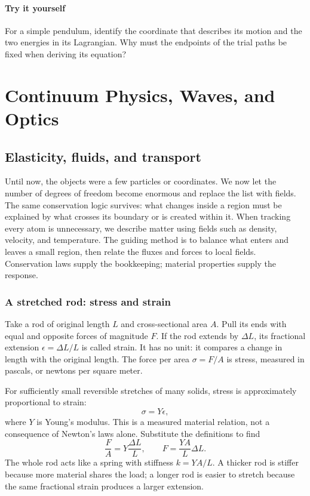 \documentclass[11pt,oneside]{book}
\theoremstyle{reviewstyle}
\newcommand{\learningcheck}[1]{\subsection*{Try it yourself}\noindent #1\par}
\begin{document}
\learningcheck{For a simple pendulum, identify the coordinate that describes its motion and the two energies in its Lagrangian. Why must the endpoints of the trial paths be fixed when deriving its equation?}

\part{Continuum Physics, Waves, and Optics}
\chapter{Elasticity, fluids, and transport}
Until now, the objects were a few particles or coordinates. We now let the number of degrees of freedom become enormous and replace the list with fields. The same conservation logic survives: what changes inside a region must be explained by what crosses its boundary or is created within it.
When tracking every atom is unnecessary, we describe matter using fields such as density, velocity, and temperature. The guiding method is to balance what enters and leaves a small region, then relate the fluxes and forces to local fields. Conservation laws supply the bookkeeping; material properties supply the response.

\section{A stretched rod: stress and strain}
Take a rod of original length $L$ and cross-sectional area $A$. Pull its ends with equal and opposite forces of magnitude $F$. If the rod extends by $\Delta L$, its fractional extension $\epsilon=\Delta L/L$ is called strain. It has no unit: it compares a change in length with the original length. The force per area $\sigma=F/A$ is stress, measured in pascals, or newtons per square meter.

For sufficiently small reversible stretches of many solids, stress is approximately proportional to strain:
\begin{equation}
\sigma=Y\epsilon,
\end{equation}
where $Y$ is Young's modulus. This is a measured material relation, not a consequence of Newton's laws alone. Substitute the definitions to find
\begin{equation}
\frac FA=Y\frac{\Delta L}{L},
\qquad F=\frac{YA}{L}\Delta L.
\end{equation}
The whole rod acts like a spring with stiffness $k=YA/L$. A thicker rod is stiffer because more material shares the load; a longer rod is easier to stretch because the same fractional strain produces a larger extension.
\end{document}
